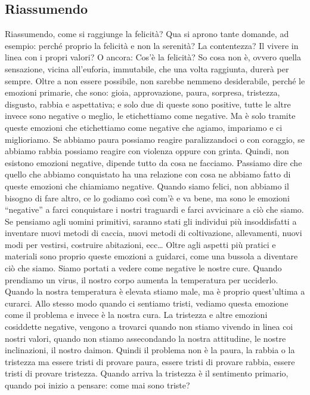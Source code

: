 \documentclass[12pt]{book} %
\begin{document}
\subsection{Riassumendo}
Riassumendo, come si raggiunge la felicità? Qua si aprono tante domande, ad esempio: perché proprio la felicità e non la
serenità? La contentezza? Il vivere in linea con i propri valori? O ancora: Cos'è la felicità? So
cosa non è, ovvero quella sensazione, vicina all'euforia, immutabile, che una volta raggiunta,
durerà per sempre. Oltre a non essere possibile, non sarebbe nemmeno desiderabile, perché le emozioni primarie, che
sono: gioia, approvazione, paura, sorpresa, tristezza, disgusto, rabbia e aspettativa; e solo due di queste sono
positive, tutte le altre invece sono negative o meglio, le etichettiamo come negative. Ma è solo tramite queste
emozioni che etichettiamo come negative che agiamo, impariamo e ci miglioriamo. Se abbiamo paura possiamo reagire
paralizzandoci o con coraggio, se abbiamo rabbia possiamo reagire con violenza oppure con grinta. Quindi, non esistono
emozioni negative, dipende tutto da cosa ne facciamo. Passiamo dire che quello che abbiamo conquistato ha una relazione con cosa ne
abbiamo fatto di queste emozioni che chiamiamo negative. Quando siamo felici, non abbiamo il bisogno di fare altro, ce lo godiamo così com'è e va bene, ma sono le emozioni
“negative” a farci conquistare i nostri traguardi e farci avvicinare a ciò che siamo. Se pensiamo agli uomini
primitivi, saranno stati gli individui più insoddisfatti a inventare nuovi metodi di caccia, nuovi metodi di
coltivazione, allevamenti, nuovi modi per vestirsi, costruire abitazioni, ecc… Oltre agli aspetti più pratici e
materiali sono proprio queste emozioni a guidarci, come una bussola a diventare ciò che siamo. Siamo portati a vedere
come negative le nostre cure. Quando prendiamo un virus, il nostro corpo aumenta la temperatura per ucciderlo. Quando
la nostra temperatura è elevata stiamo male, ma è proprio quest'ultima a curarci. Allo stesso modo
quando ci sentiamo tristi, vediamo questa emozione come il problema e invece è la nostra cura. La tristezza e altre
emozioni cosiddette negative, vengono a trovarci quando non stiamo vivendo in linea coi nostri valori, quando non
stiamo assecondando la nostra attitudine, le nostre inclinazioni, il nostro daimon. Quindi il problema non è la paura,
la rabbia o la tristezza ma essere tristi di provare paura, essere tristi di provare rabbia, essere tristi di provare
tristezza. Quando arriva la tristezza è il sentimento primario, quando poi inizio a pensare: come mai sono triste?
\end{document}
